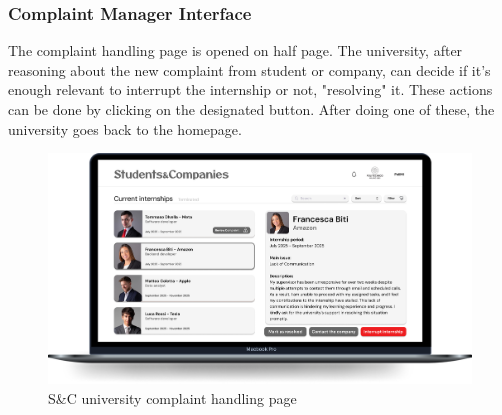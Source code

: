 \subsubsection{Complaint Manager Interface}
The complaint handling page is opened on half page. The university, after reasoning about the new complaint from student or company, can decide if it's enough relevant to interrupt the internship or not, "resolving" it. These actions can be done by clicking on the designated button. After doing one of these, the university goes back to the homepage. \\

\begin{figure}[H]
    \centering
    \includegraphics[width=0.9\linewidth]{Images/Mock-up/University complaint handle.png}
    \caption{S\&C university complaint handling page}
    \label{fig:homepage-design}
\end{figure}